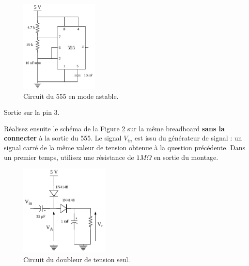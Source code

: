 \documentclass{../../template/labo}
\begin{document}
\begin{figure}[ht]
\centering
\includegraphics[width=0.35\textwidth]{555.pdf}
\caption{Circuit du 555 en mode astable.}
\label{NE555}
\end{figure}

{
	Sortie sur la pin 3.
}


Réalisez ensuite le schéma de la Figure \ref{Doubleur2} sur la même breadboard \textbf{sans la connecter} à la sortie du 555. Le signal $V_{in}$ est issu du générateur de signal : un signal carré de la même valeur de tension obtenue à la question précédente.
Dans un premier temps, utilisez une résistance de $1 M\Omega$ en sortie du montage.




\begin{figure}[ht]
\centering
\includegraphics[width=0.4\textwidth]{doubler.pdf}
\caption{Circuit du doubleur de tension seul.}
\label{Doubleur2}
\end{figure}

{

}
\end{document}
